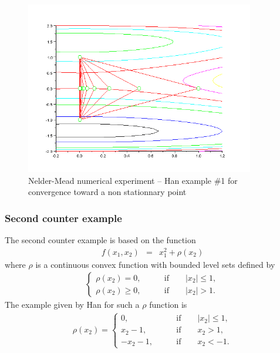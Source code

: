 \begin{figure}
\begin{center}
\includegraphics[width=10cm]{neldermeadmethod/han1-history-simplex.png}
\end{center}
\caption{Nelder-Mead numerical experiment -- Han example \#1 for convergence toward
a non stationnary point}
\label{fig-nm-numexp-han1}
\end{figure}

\subsubsection{Second counter example}

The second counter example is based on the function 
\begin{eqnarray}
\label{han-function2}
f(x_1,x_2) &=& x_1^2 + \rho(x_2)
\end{eqnarray}
where $\rho$ is a continuous convex function with bounded level
sets defined by
\begin{eqnarray}
\label{han-function2-rho}
\left\{
\begin{array}{ll}
\rho(x_2) =0, &\qquad \textrm{if} \qquad |x_2|\leq 1, \\
\rho(x_2)\geq 0, &\qquad \textrm{if} \qquad |x_2|> 1.
\end{array}
\right.
\end{eqnarray}
The example given by Han for such a $\rho$ function is 
\begin{eqnarray}
\label{han-function2-rho2}
\rho(x_2) =
\left\{
\begin{array}{ll}
0, &\qquad \textrm{if} \qquad |x_2|\leq 1, \\
x_2 - 1, &\qquad \textrm{if} \qquad x_2> 1, \\
-x_2 - 1, &\qquad \textrm{if} \qquad x_2 < -1.
\end{array}
\right.
\end{eqnarray}

